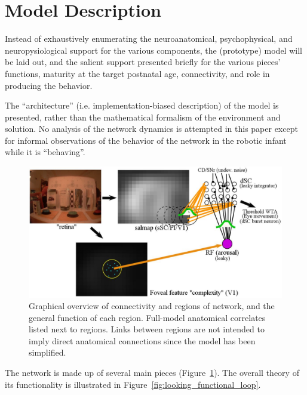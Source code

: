 \documentclass[conference]{IEEEtran}
\begin{document}
\section{Model Description}
Instead of exhaustively enumerating the neuroanatomical,
psychophysical, and neuropysiological support for the various
components, the (prototype) model will be laid out, and the salient
support presented briefly for the various pieces' functions, maturity
at the target postnatal age, connectivity, and role in producing the
behavior.

The ``architecture'' (i.e. implementation-biased description) of the
model is presented, rather than the mathematical formalism of the
environment and solution. No analysis of the network dynamics is
attempted in this paper except for informal observations of the
behavior of the network in the robotic infant while it is
``behaving''.

\begin{figure} [!t]
\centering
\includegraphics[width=15.0cm]{looking_prototype_model.jpg}
\caption{Graphical overview of connectivity and regions of network,
  and the general function of each region. Full-model anatomical
  correlates listed next to regions. Links between regions are not
  intended to imply direct anatomical connections since the model has
  been simplified.}
\label{fig:looking_prototype_model}
\end{figure}

The network is made up of several main pieces
(Figure~\ref{fig:looking_prototype_model}). The overall theory of its
functionality is illustrated in
Figure~\ref{fig:looking_functional_loop}.
\end{document}
